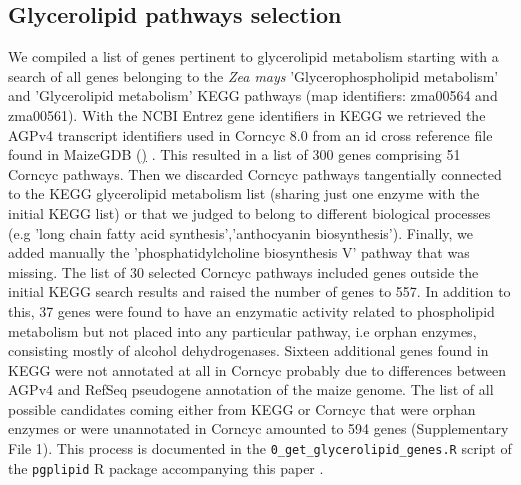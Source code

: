 \documentclass[9pt,twocolumn,twoside,lineno]{BioRxiv}
\begin{document}
\subsection{Glycerolipid pathways selection}
We compiled a list of genes pertinent to glycerolipid metabolism starting with a search of all genes belonging to the \textit{Zea mays} 'Glycerophospholipid metabolism' and 'Glycerolipid metabolism' KEGG pathways \cite{kanehisa2019} (map identifiers: zma00564 and zma00561). 
With the NCBI Entrez gene identifiers in KEGG we retrieved the AGPv4 transcript identifiers used in Corncyc 8.0 \cite{portwood2019, walsh2016} from an id cross reference file found in MaizeGDB (\href{https://www.maizegdb.org/search/gene/download_gene_xrefs.php?relative=v4}) \cite{portwood2019}.
This resulted in a list of 300 genes comprising 51 Corncyc pathways. 
Then we discarded Corncyc pathways  tangentially connected to the KEGG glycerolipid metabolism list (sharing just one enzyme with the initial KEGG list) or that we judged to belong to different biological processes (e.g 'long chain fatty acid synthesis','anthocyanin biosynthesis'). 
Finally, we added manually the 'phosphatidylcholine biosynthesis V' pathway that was missing. 
The list of 30 selected Corncyc pathways included genes outside the initial KEGG search results and raised the number of genes to 557. 
In addition to this, 37 genes were found to have an enzymatic activity related to phospholipid metabolism but not placed into any particular pathway, i.e orphan enzymes, consisting mostly of alcohol dehydrogenases. 
Sixteen additional genes found in KEGG were not annotated at all in Corncyc probably due to differences between AGPv4 and RefSeq pseudogene annotation of the maize genome. 
The list of all possible candidates coming either from KEGG or Corncyc that were orphan enzymes or were unannotated in Corncyc amounted to 594 genes (Supplementary File 1). 
This process is documented in the \verb|0_get_glycerolipid_genes.R| script of the \verb|pgplipid| R package accompanying this paper \cite{fausto_rodriguez_zapata_2020_4323410}.
\end{document}
